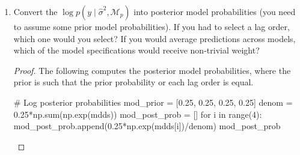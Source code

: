 \documentclass[oneside,reqno]{amsart}
\newcommand{\M}{\mathcal{M}}
\theoremstyle{definition}
\begin{document}
\begin{enumerate}
\begin{proof}
Fit the model.
\begin{python3code}
def ar_bayes(df, lags, tau): 
    y = df['GDPC1'][lags:]
    X = df
    # Model i data
    for col in X.columns:
        for l in range(1,lags+1):
            X.loc[:,col+"_L"+str(l)] = X[col].shift(l)
    X = df.drop(['GDPC1'], axis=1).dropna()
    from statsmodels.api import add_constant
    X = add_constant(X)
    T = len(ts) - lags
    
    from numpy.linalg import inv, det
    # Prior means and covariance matrices
    phi_0 = np.zeros(lags+1)
    V_0 = tau*np.eye(lags+1)
    
    # Posterior means and covariance matrices
    V_1 = inv(X.T @ X + inv(V_0))
    phi_1 = V_1 @ (X.T @ y + inv(V_0) @ phi_0.T)
    
    sigma2 = ((y - X @ phi_1).T @ (y - X @ phi_1))/T
    
    mdd = -T/2*np.log(2*np.pi*sigma2) \
                      - 0.5*np.log(det(V_0)/det(V_1)) \
            - 0.5/sigma2*(y.T @ y + phi_0.T @ inv(V_0) \
               @ phi_0 - phi_1.T @ inv(V_1) @ phi_1) 

    return {'phi_1':phi_1, 'V_1': V_1, 'mdd':mdd} 

# Marginal likelihoods
mdds = []
for i in range(1, 5):
    mdds.append(ar_bayes(ts[:], i, tau=10)['mdd'])
mdds
\end{python3code}

The marginal data density values are $285.03$, $284.28$, $ 282.36$, and $279.41$ for models $\M_1$, $\M_2$, $\M_3$, and $\M_4$, respectively. The optimal lag order is therefore one.
\end{proof}

\item
Convert the $\log p(y \mid \hat \sigma^2, \M_p)$ into posterior model probabilities (you need to assume some prior model probabilities). If you had to select a lag order, which one would you select? If you would average predictions across models, which of the model specifications would receive non-trivial weight?


\begin{proof}
The following computes the posterior model probabilities, where the prior is such that the prior probability or each lag order is equal.
\begin{python3code}
# Log posterior probabilities
mod_prior = [0.25, 0.25, 0.25, 0.25]
denom = 0.25*np.sum(np.exp(mdds))
mod_post_prob = []
for i in range(4):
    mod_post_prob.append(0.25*np.exp(mdds[i])/denom)
mod_post_prob
\end{python3code}


\end{proof}
\end{enumerate}
\end{document}
